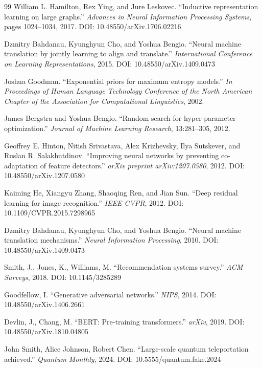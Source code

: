 \documentclass{article}
\begin{document}
\begin{thebibliography}{99}
William L. Hamilton, Rex Ying, and Jure Leskovec.
``Inductive representation learning on large graphs.''
\textit{Advances in Neural Information Processing Systems}, pages 1024--1034, 2017.
DOI: 10.48550/arXiv.1706.02216

Dzmitry Bahdanau, Kyunghyun Cho, and Yoshua Bengio.
``Neural machine translation by jointly learning to align and translate.''
\textit{International Conference on Learning Representations}, 2015.
DOI: 10.48550/arXiv.1409.0473

Joshua Goodman.
``Exponential priors for maximum entropy models.''
\textit{In Proceedings of Human Language Technology Conference of the North American Chapter of the Association for Computational Linguistics}, 2002.

James Bergstra and Yoshua Bengio.
``Random search for hyper-parameter optimization.''
\textit{Journal of Machine Learning Research}, 13:281--305, 2012.

Geoffrey E. Hinton, Nitish Srivastava, Alex Krizhevsky, Ilya Sutskever, and Ruslan R. Salakhutdinov.
``Improving neural networks by preventing co-adaptation of feature detectors.''
\textit{arXiv preprint arXiv:1207.0580}, 2012.
DOI: 10.48550/arXiv.1207.0580


Kaiming He, Xiangyu Zhang, Shaoqing Ren, and Jian Sun.
``Deep residual learning for image recognition.''
\textit{IEEE CVPR}, 2012.
DOI: 10.1109/CVPR.2015.7298965

Dzmitry Bahdanau, Kyunghyun Cho, and Yoshua Bengio.
``Neural machine translation mechanisms.''
\textit{Neural Information Processing}, 2010.
DOI: 10.48550/arXiv.1409.0473

Smith, J., Jones, K., Williams, M.
``Recommendation systems survey.''
\textit{ACM Surveys}, 2018.
DOI: 10.1145/3285289

Goodfellow, I.
``Generative adversarial networks.''
\textit{NIPS}, 2014.
DOI: 10.48550/arXiv.1406.2661

Devlin, J., Chang, M.
``BERT: Pre-training transformers.''
\textit{arXiv}, 2019.
DOI: 10.48550/arXiv.1810.04805


John Smith, Alice Johnson, Robert Chen.
``Large-scale quantum teleportation achieved.''
\textit{Quantum Monthly}, 2024.
DOI: 10.5555/quantum.fake.2024


\end{thebibliography}
\end{document}
